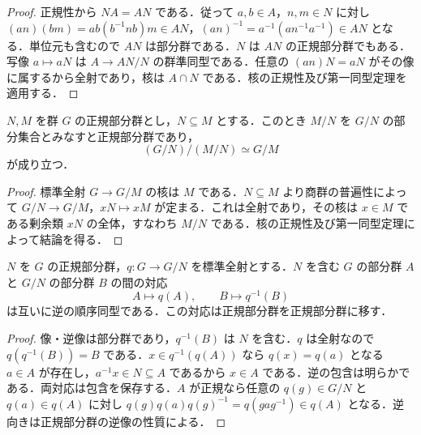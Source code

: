 \begin{proof}
正規性から $NA=AN$ である．従って $a,b\in A$，$n,m\in N$ に対し $(an)(bm)=ab(b^{-1}nb)m\in AN$，$(an)^{-1}=a^{-1}(an^{-1}a^{-1})\in AN$ となる．単位元も含むので $AN$ は部分群である．$N$ は $AN$ の正規部分群でもある．写像 $a\mapsto aN$ は $A\to AN/N$ の群準同型である．任意の $(an)N=aN$ がその像に属するから全射であり，核は $A\cap N$ である．核の正規性及び第一同型定理を適用する．
\end{proof}
\begin{thm}[第三同型定理]
$N,M$ を群 $G$ の正規部分群とし，$N\subseteq M$ とする．このとき $M/N$ を $G/N$ の部分集合とみなすと正規部分群であり，
\[
 (G/N)/(M/N)\simeq G/M
\]
が成り立つ．
\end{thm}
\begin{proof}
標準全射 $G\to G/M$ の核は $M$ である．$N\subseteq M$ より商群の普遍性によって $G/N\to G/M$，$xN\mapsto xM$ が定まる．これは全射であり，その核は $x\in M$ である剰余類 $xN$ の全体，すなわち $M/N$ である．核の正規性及び第一同型定理によって結論を得る．
\end{proof}
\begin{thm}[部分群対応定理]
$N$ を $G$ の正規部分群，$q:G\to G/N$ を標準全射とする．$N$ を含む $G$ の部分群 $A$ と $G/N$ の部分群 $B$ の間の対応
\[
 A\longmapsto q(A),\qquad B\longmapsto q^{-1}(B)
\]
は互いに逆の順序同型である．この対応は正規部分群を正規部分群に移す．
\end{thm}
\begin{proof}
像・逆像は部分群であり，$q^{-1}(B)$ は $N$ を含む．$q$ は全射なので $q(q^{-1}(B))=B$ である．$x\in q^{-1}(q(A))$ なら $q(x)=q(a)$ となる $a\in A$ が存在し，$a^{-1}x\in N\subseteq A$ であるから $x\in A$ である．逆の包含は明らかである．両対応は包含を保存する．$A$ が正規なら任意の $q(g)\in G/N$ と $q(a)\in q(A)$ に対し $q(g)q(a)q(g)^{-1}=q(gag^{-1})\in q(A)$ となる．逆向きは正規部分群の逆像の性質による．
\end{proof}
